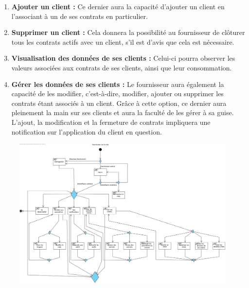 \begin{enumerate}[-]

\item \textbf{Ajouter un client : }
\newline
Ce dernier aura la capacité d’ajouter un client en l’associant à un de ses contrats en particulier.

\item \textbf{Supprimer un client :}
\newline
Cela donnera la possibilité au fournisseur de clôturer tous les contrats actifs avec un client, s’il est d’avis que cela est nécessaire.

\item \textbf{Visualisation des données de ses clients :}
\newline
Celui-ci pourra observer les valeurs associées aux contrats de ses clients, ainsi que leur consommation.

\item \textbf{Gérer les données de ses clients : }
\newline
Le fournisseur aura également la capacité de les modifier, c’est-à-dire, modifier, ajouter ou supprimer les contrats étant associés à un client.
\newline
Grâce à cette option, ce dernier aura pleinement la main sur ses clients et aura la faculté de les gérer à sa guise.
\newline
L’ajout, la modification et la fermeture de contrats impliquera une notification sur l’application du client en question.

\end{enumerate}

\newpage

\begin{figure}[h]
\centering
\includegraphics[width = 1\textwidth]{overview/overview-fournisseur.png}
\end{figure}